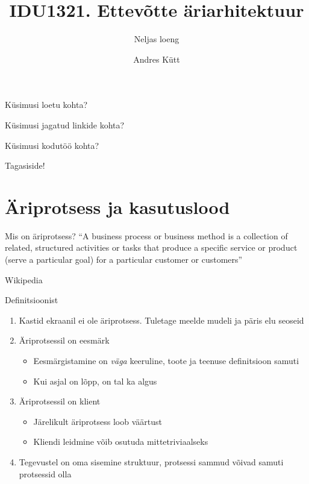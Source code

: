 \documentclass{beamer}
\title{IDU1321. Ettevõtte äriarhitektuur}
\subtitle{Neljas loeng}
\author{Andres Kütt}
\institute{Cybernetica, arhitekt}
\begin{document}
\begin{frame}
\titlepage
\end{frame}

\begin{frame}[standout]
Küsimusi loetu kohta?
\end{frame}


\begin{frame}[standout]
Küsimusi jagatud linkide kohta?
\end{frame}

\begin{frame}[standout]
Küsimusi kodutöö kohta?
\end{frame}

\begin{frame}[standout]
Tagasiside!
\end{frame}


\section{Äriprotsess ja kasutuslood}

\begin{frame}{Mis on äriprotsess?}
	\enquote{A business process or business method is a collection of related, structured activities or tasks that produce a specific service or product (serve a particular goal) for a particular customer or customers}

	Wikipedia
\end{frame}

\begin{frame}{Definitsioonist}
	\begin{enumerate}
		\item Kastid ekraanil ei ole äriprotsess. Tuletage meelde mudeli ja päris elu seoseid
		\item Äriprotsessil on eesmärk
		\begin{itemize}
			\item Eesmärgistamine on \emph{väga} keeruline, toote ja teenuse definitsioon samuti
			\item Kui asjal on lõpp, on tal ka algus
		\end{itemize}
		\item Äriprotsessil on klient
		\begin{itemize}
			\item Järelikult äriprotsess loob väärtust
			\item Kliendi leidmine võib osutuda mittetriviaalseks
		\end{itemize}
		\item Tegevustel on oma sisemine struktuur, protsessi sammud võivad samuti protsessid olla
	\end{enumerate}
\end{frame}
\end{document}
